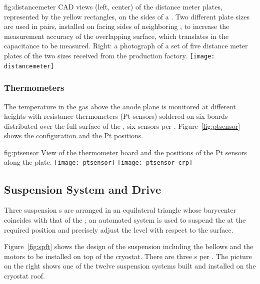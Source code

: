 \begin{dunefigure}{fig:distancemeter}
{CAD views (left, center) of the distance meter plates, represented by the yellow rectangles, on the sides of a . Two different plate sizes are used in pairs, installed on facing sides of neighboring , 
to increase the measurement accuracy of the overlapping surface, which translates in the capacitance to be measured. Right: a photograph of a set of five distance meter plates of the two sizes received from the production factory.}
\texttt{[image: distancemeter]}
\end{dunefigure}

\subsubsection{Thermometers}

The temperature in the gas above the anode plane is monitored at different heights with resistance thermometers (Pt sensors) soldered on  six  boards distributed over the full surface of the , six 
sensors per . Figure~\ref{fig:ptsensor} shows the configuration and the Pt positions.

\begin{dunefigure}{fig:ptsensor}
{View of the thermometer board and the positions of the Pt sensors along the  plate.}
\texttt{[image: ptsensor]}
\texttt{[image: ptsensor-crp]}
\end{dunefigure}


\subsection{Suspension System and Drive}
\label{sec:fddp-crp-suspension}

Three suspension \fdth{}s are arranged in an equilateral triangle whose barycenter coincides with that of the ; an automated system is used to suspend the  at the required position and precisely adjust the  level with respect to the  surface.

Figure~\ref{fig:spft} shows the design of the suspension \fdth including the bellows and the motors to be installed on top of the cryostat. There are three \fdth{}s per . The picture on the right shows one of the twelve suspension systems built and installed on the  cryostat roof.

